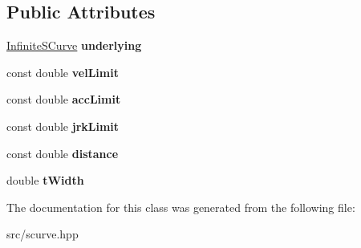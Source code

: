 \subsection*{Public Attributes}
\begin{DoxyCompactItemize}
\item 
\mbox{\label{classSCurve_ac886cfc41a724e4218f544ab6c360359}} 
\hyperlink{structInfiniteSCurve}{Infinite\+S\+Curve} {\bfseries underlying}
\item 
\mbox{\label{classSCurve_a5614565910af8581fa3806b3c8337eb9}} 
const double {\bfseries vel\+Limit}
\item 
\mbox{\label{classSCurve_a24efc2a4fc25ad5744a6880f82d8f45e}} 
const double {\bfseries acc\+Limit}
\item 
\mbox{\label{classSCurve_a7581bae615cbf086aaf01fe2f0276e6d}} 
const double {\bfseries jrk\+Limit}
\item 
\mbox{\label{classSCurve_a16296957d5dfb480cffd47b96a211789}} 
const double {\bfseries distance}
\item 
\mbox{\label{classSCurve_aaabc0d38585486ef01eee4d36e929772}} 
double {\bfseries t\+Width}
\end{DoxyCompactItemize}


The documentation for this class was generated from the following file\+:\begin{DoxyCompactItemize}
\item 
src/scurve.\+hpp\end{DoxyCompactItemize}
